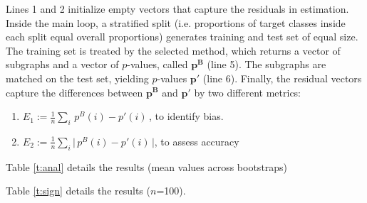 \documentclass{article}
\begin{document}
Lines 1 and 2 initialize empty vectors that capture the residuals in estimation. Inside the main loop, a stratified split (i.e. proportions of target classes inside each split equal overall proportions) generates training and test set of equal size. The training set is treated by the selected method, which returns a vector of subgraphs and a vector of $p$-values, called $\mathbf{p^B}$ (line 5). The subgraphs are matched on the test set, yielding $p$-values $\mathbf{p'}$ (line 6). Finally, the residual vectors capture the differences between $\mathbf{p^B}$ and  $\mathbf{p'}$ by two different metrics:
\begin{enumerate}
  \item $E_1 := \frac{1}{n} \sum_i \,p^B(i) -p'(i) \,$, to identify bias.
  \item $E_2 := \frac{1}{n} \sum_i \Big|\,p^B(i) -p'(i) \,\Big|$, to assess accuracy
\end{enumerate}

Table \ref{t:anal} details the results (mean values across bootstraps)


Table \ref{t:sign} details the results ($n$=100). 




\end{document}

